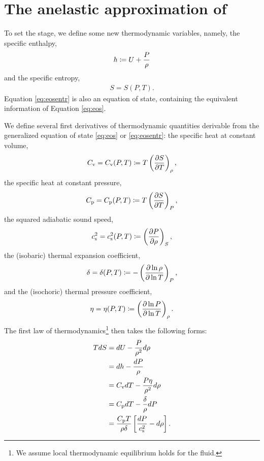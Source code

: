 \documentclass[12pt]{article}
\begin{document}
	\section{The anelastic approximation of \citet{Gough1969}}
	To set the stage, we define some new thermodynamic variables, namely, the specific enthalpy,
\begin{align}\label{eq:enthalpy}
	h\coloneqq U + \frac{P}{\rho}
\end{align}
and the specific entropy,
\begin{align}\label{eq:eosentr}
	S = S(P,T).
\end{align}
Equation \eqref{eq:eosentr} is also an equation of state, containing the equivalent information of Equation \eqref{eq:eos}. 

We define several first derivatives of thermodynamic quantities derivable from the generalized equation of state \eqref{eq:eos} or \eqref{eq:eosentr}: the specific heat at constant volume,
\begin{align}\label{eq:cv}
	C_{\rm{v}}=C_{\rm{v}}(P,T)\coloneqq T\left(\frac{\partial S}{\partial T}\right)_\rho,
\end{align}
the specific heat at constant pressure, 
\begin{align}\label{eq:cp}
	C_{\rm{p}}=C_{\rm{p}}(P,T)\coloneqq T\left(\frac{\partial S}{\partial T}\right)_P,
\end{align}
the squared adiabatic sound speed,
\begin{align}\label{eq:cs2}
	c_{\rm s}^2=c_{\rm s}^2(P,T)\coloneqq \left(\frac{\partial P}{\partial\rho}\right)_S,
\end{align}
the (isobaric) thermal expansion coefficient,
\begin{align}\label{eq:delta}
	\delta=\delta(P,T)\coloneqq-\left(\frac{\partial\ln\rho}{\partial\ln T}\right)_P,
\end{align}
and the (isochoric) thermal pressure coefficient, 
\begin{align}\label{eq:eta}
	\eta=\eta(P,T)\coloneqq\left(\frac{\partial\ln P}{\partial\ln T}\right)_\rho.
\end{align}
The first law of thermodynamics\footnote{We assume local thermodynamic equilibrium holds for the fluid.} then takes the following forms:
\begin{subequations}\label{eq:firstlaw}
	\begin{align}
		TdS &= dU - \frac{P}{\rho^2}d\rho \label{eq:firstlawinterho} \\
		&= dh - \frac{dP}{\rho}\label{eq:firstlawenthprs}\\
		&= C_{\rm{v}} dT - \frac{P\eta}{\rho^2}d\rho\label{eq:firstlawtmprho}\\		
		&= C_{\rm{p}} dT - \frac{\delta}{\rho}dP\label{eq:firstlawtmpprs}\\
		&=\frac{C_{\rm{p}} T}{\rho\delta}\left[\frac{dP}{c_{\rm s}^2}-d\rho\right]\label{eq:firstlawprsrho}.
	\end{align}
\end{subequations}
\end{document}
